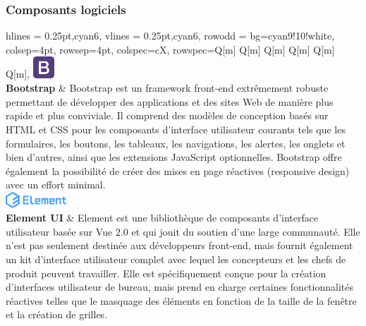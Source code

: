 \subsubsection{Composants logiciels}
\begin{longtblr}[caption={Technologies utilisées au niveau du front-end}]{
    hlines = {0.25pt,cyan6},
    vlines = {0.25pt,cyan6},
    row{odd} = {bg=cyan9!10!white},
    colsep=4pt,
    rowsep=4pt,
	colspec={cX},
    rowspec={Q[m] Q[m] Q[m] Q[m] Q[m] Q[m]},
}
{
\includegraphics[height=8mm]{images/sec5/bootstrap.pdf}
\\\textbf{Bootstrap}
}
& 
Bootstrap est un framework front-end extrêmement robuste permettant de développer des applications et des sites Web de manière plus rapide et plus conviviale. Il comprend des modèles de conception basés sur HTML et CSS pour les composants d'interface utilisateur courants tels que les formulaires, les boutons, les tableaux, les navigations, les alertes, les onglets et bien d'autres, ainsi que les extensions JavaScript optionnelles.
Bootstrap offre également la possibilité de créer des mises en page réactives (responsive design) avec un effort minimal.\\

{
\includegraphics[height=6mm]{images/sec5/elementui.pdf}\\\textbf{Element UI}
}
& 
Element est une bibliothèque de composants d'interface utilisateur basée sur Vue 2.0 et qui jouit du soutien d'une large communauté. Elle n'est pas seulement destinée aux développeurs front-end, mais fournit également un kit d'interface utilisateur complet avec lequel les concepteurs et les chefs de produit peuvent travailler. Elle est spécifiquement conçue pour la création d'interfaces utilisateur de bureau, mais prend en charge certaines fonctionnalités réactives telles que le masquage des éléments en fonction de la taille de la fenêtre et la création de grilles.
\\


\end{longtblr}
